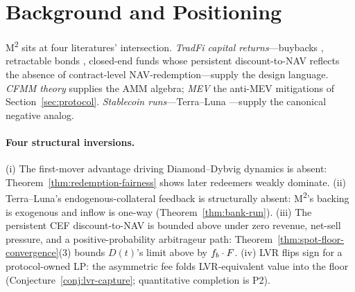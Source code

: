 \section{Background and Positioning}
\label{sec:related-work}

M\textsuperscript{2} sits at four literatures' intersection. \emph{TradFi capital returns}---buybacks \citep{GrullonMichaely2002}, retractable bonds \citep{BrennanSchwartz1977}, closed-end funds whose persistent discount-to-NAV \citep{LeeShleiferThaler1991,Pontiff1996,CherkesSagiStanton2009} reflects the absence of contract-level NAV-redemption---supply the design language. \emph{CFMM theory} \citep{Angeris2020,UniswapV4} supplies the AMM algebra; \emph{MEV} \citep{Daian2020} the anti-MEV mitigations of Section~\ref{sec:protocol}. \emph{Stablecoin runs}---Terra--Luna \citep{LiuMakarovSchoar2023}---supply the canonical negative analog.

\paragraph{Four structural inversions.} (i) The \citet{ChenGoldsteinJiang2010} first-mover advantage driving Diamond--Dybvig \citep{DiamondDybvig1983} dynamics is absent: Theorem~\ref{thm:redemption-fairness} shows later redeemers weakly dominate. (ii) Terra--Luna's endogenous-collateral feedback \citep{LiuMakarovSchoar2023,Briola2023} is structurally absent: M\textsuperscript{2}'s backing is exogenous and inflow is one-way (Theorem~\ref{thm:bank-run}). (iii) The persistent CEF discount-to-NAV \citep{LeeShleiferThaler1991,Pontiff1996,CherkesSagiStanton2009} is bounded above under zero revenue, net-sell pressure, and a positive-probability arbitrageur path: Theorem~\ref{thm:spot-floor-convergence}(3) bounds $D(t)$'s limit above by $f_b \cdot F$. (iv) LVR \citep{MilionisMoallemiRoughgarden2023} flips sign for a protocol-owned LP: the asymmetric fee folds LVR-equivalent value into the floor (Conjecture~\ref{conj:lvr-capture}; quantitative completion is P2).
